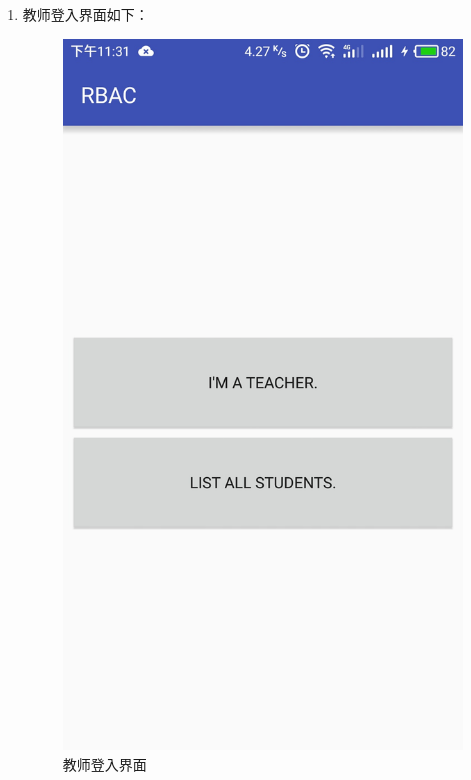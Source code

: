 \begin{itemize}
\begin{enumerate}
\begin{itemize}
\begin{enumerate}
				\item 教师登入界面如下：
				\begin{figure}[H]
					\centering
					\includegraphics[height=0.39\textheight]{snapshot/5}
					\caption{教师登入界面}
					\label{fig:5}
				\end{figure}
			

\end{enumerate}
\end{itemize}
\end{enumerate}
\end{itemize}
